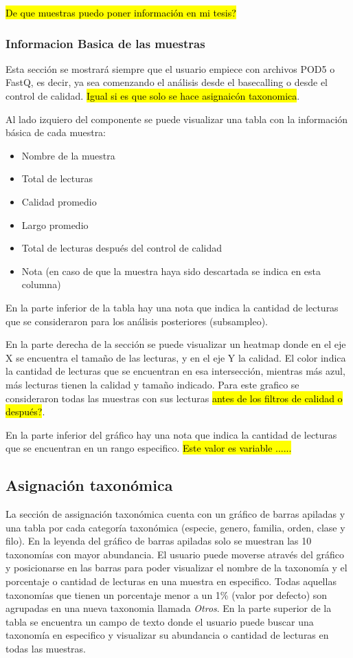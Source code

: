 \hl{De que muestras puedo poner información en mi tesis?}
\subsubsection{Informacion Basica de las muestras}
Esta sección se mostrará siempre que el usuario empiece con archivos POD5 o FastQ, es decir, ya sea comenzando el análisis desde el basecalling o desde el control de calidad. \hl{Igual si es que solo se hace asignaicón taxonomica}.

Al lado izquiero del componente se puede visualizar una tabla con la información básica de cada muestra:
\begin{itemize}
    \item Nombre de la muestra
    \item Total de lecturas
    \item Calidad promedio
    \item Largo promedio
    \item Total de lecturas después del control de calidad
    \item Nota (en caso de que la muestra haya sido descartada se indica en esta columna)
\end{itemize}
En la parte inferior de la tabla hay una nota que indica la cantidad de lecturas que se consideraron para los análisis posteriores (subsampleo).

En la parte derecha de la sección se puede visualizar un heatmap donde en el eje X se encuentra el tamaño de las lecturas, y en el eje Y la calidad. El color indica la cantidad de lecturas que se encuentran en esa intersección, mientras más azul, más lecturas tienen la calidad y tamaño indicado.
Para este grafico se consideraron todas las muestras con sus lecturas \hl{antes de los filtros de calidad o después?}.

En la parte inferior del gráfico hay una nota que indica la cantidad de lecturas que se encuentran en un rango especifico. \hl{Este valor es variable ......}
\subsection{Asignación taxonómica}
La sección de assignación taxonómica cuenta con un gráfico de barras apiladas y una tabla por cada categoría taxonómica (especie, genero,  familia, orden, clase y filo).
En la leyenda del gráfico de barras apiladas solo se muestran las 10 taxonomías con mayor abundancia. El usuario puede moverse através del gráfico y posicionarse en las barras para poder visualizar el nombre de la taxonomía y el porcentaje o cantidad de lecturas en una muestra en especifico. Todas aquellas taxonomías que tienen un porcentaje menor a un 1\% (valor por defecto) son agrupadas en una nueva taxonomia llamada \textit{Otros}.
En la parte superior de la tabla se encuentra un campo de texto donde el usuario puede buscar una taxonomía en especifico y visualizar su abundancia o cantidad de lecturas en todas las muestras.

